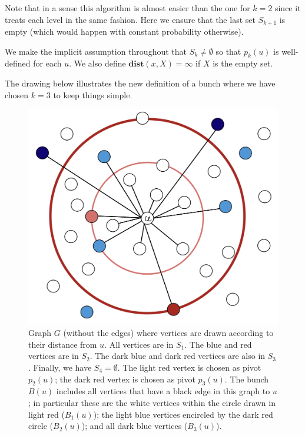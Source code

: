 Note that in a sense this algorithm is almost easier than the one for $k=2$ since it treats each level in the same fashion. Here we ensure that the last set $S_{k+1}$ is empty (which would happen with constant probability otherwise). 

We make the implicit assumption throughout that $S_k \neq \emptyset$ so that $p_k(u)$ is well-defined for each $u$. We also define $\mathbf{dist}(x,X) = \infty$ if $X$ is the empty set.

The drawing below illustrates the new definition of a bunch where we have chosen $k=3$ to keep things simple.

\begin{figure}[!ht]
    \centering
    \includegraphics[scale=0.25]{./fig/lecture_DistanceOracles_MultiLevelBunch.jpg}
    \caption{Graph $G$ (without the edges) where vertices are drawn according to their distance from $u$. All vertices are in $S_1$. The blue and red vertices are in $S_2$. The dark blue and dark red vertices are also in $S_3$. Finally, we have $S_4 = \emptyset$. 
    The light red vertex is chosen as pivot $p_2(u)$; the dark red vertex is chosen as pivot $p_3(u)$. 
    The bunch $B(u)$ includes all vertices that have a black edge in this graph to $u$; in particular these are the white vertices within the circle drawn in light red ($B_1(u)$); the light blue vertices encircled by the dark red circle ($B_2(u)$); and all dark blue vertices ($B_3(u)$).}
\end{figure}

